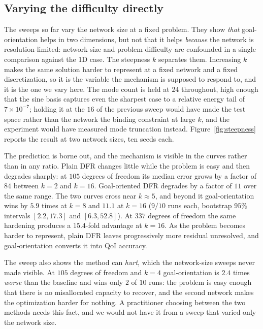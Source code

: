 \documentclass[preprint,11pt]{elsarticle}
\begin{document}
\subsection{Varying the difficulty directly}
\label{sec:results-steepness}

The sweeps so far vary the network size at a fixed problem. They show \emph{that} goal-orientation helps in two dimensions, but not that it helps \emph{because} the network is resolution-limited: network size and problem difficulty are confounded in a single comparison against the 1D case. The steepness $k$ separates them. Increasing $k$ makes the same solution harder to represent at a fixed network and a fixed discretization, so it is the variable the mechanism is supposed to respond to, and it is the one we vary here. The mode count is held at $24$ throughout, high enough that the sine basis captures even the sharpest case to a relative energy tail of $7 \times 10^{-7}$; holding it at the $16$ of the previous sweep would have made the test space rather than the network the binding constraint at large $k$, and the experiment would have measured mode truncation instead. Figure~\ref{fig:steepness} reports the result at two network sizes, ten seeds each.

The prediction is borne out, and the mechanism is visible in the curves rather than in any ratio. Plain DFR changes little while the problem is easy and then degrades sharply: at $105$ degrees of freedom its median error grows by a factor of $84$ between $k = 2$ and $k = 16$. Goal-oriented DFR degrades by a factor of $11$ over the same range. The two curves cross near $k \approx 5$, and beyond it goal-orientation wins by $5.9$ times at $k = 8$ and $11.1$ at $k = 16$ ($9/10$ runs each, bootstrap $95\%$ intervals $[2.2, 17.3]$ and $[6.3, 52.8]$). At $337$ degrees of freedom the same hardening produces a $15.4$-fold advantage at $k = 16$. As the problem becomes harder to represent, plain DFR leaves progressively more residual unresolved, and goal-orientation converts it into QoI accuracy.

The sweep also shows the method can \emph{hurt}, which the network-size sweeps never made visible. At $105$ degrees of freedom and $k = 4$ goal-orientation is $2.4$ times \emph{worse} than the baseline and wins only $2$ of $10$ runs: the problem is easy enough that there is no misallocated capacity to recover, and the second network makes the optimization harder for nothing. A practitioner choosing between the two methods needs this fact, and we would not have it from a sweep that varied only the network size.
\end{document}
